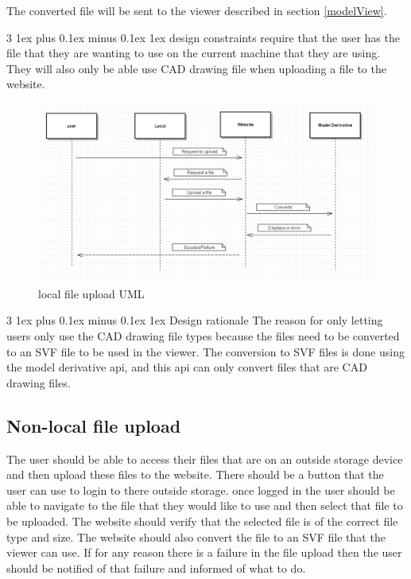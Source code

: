 \documentclass[letterpaper, 10pt, draftclsnofoot, compsoc, onecolumn]{IEEEtran}
\makeatletter
\def\subsubsection{\@startsection{subsubsection}%
                                 {3}%
                                 {\z@}%
                                 {1ex plus 0.1ex minus 0.1ex}%
                                 {1ex}%
                                 {\normalfont\normalsize}}%
\makeatother
\begin{document}
	The converted file will be sent to the viewer described in section \ref{modelView}. 

\subsubsection{design constraints} require that the user has the file that they are wanting to use on the current machine that they are using. They will also only be able use CAD drawing file when uploading a file to the website.  

\begin{figure}[ht]
	\includegraphics[scale=0.5]{localUpload.png}
	\caption{local file upload UML}
\end{figure}

\subsubsection{Design rationale}
	The reason for only letting users only use the CAD drawing file types because the files need to be converted to an SVF file to be used in the viewer. The conversion to SVF files is done using the model derivative api, and this api can only convert files that are CAD drawing files. 

\subsection{Non-local file upload}
	The user should be able to  access their files that are on an outside storage device and then upload these files to the website. There should be a button that the user can use to login to there outside storage. once logged in the user should be able to navigate to the file that they would like to use and then select that file to be uploaded. The website should verify that the selected file is of the correct file type and size. The website should also convert the file to an SVF file that the viewer can use. If for any reason there is a failure in the file upload then the user should be notified of that failure and informed of what to do.
\end{document}
